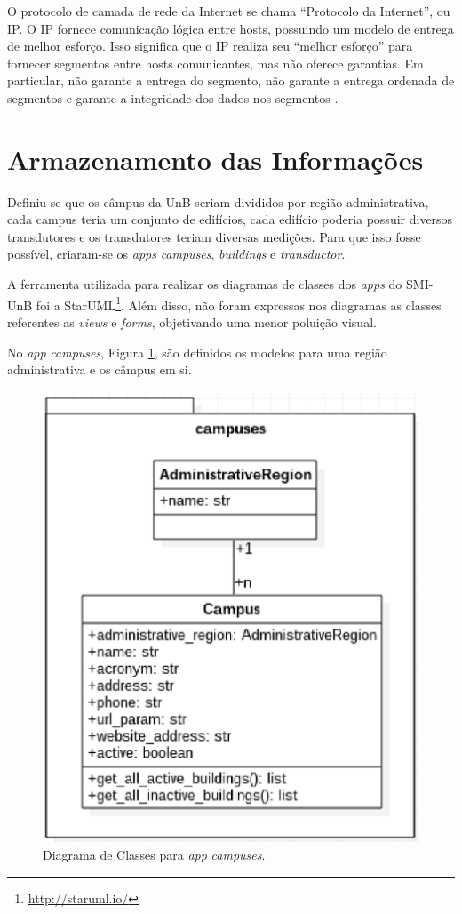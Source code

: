     O protocolo de camada de rede da Internet se chama ``Protocolo da Internet'', ou IP. O IP fornece comunicação lógica entre hosts, possuindo um modelo de entrega de melhor esforço. Isso significa que o IP realiza seu ``melhor esforço'' para fornecer segmentos entre hosts comunicantes, mas não oferece garantias. Em particular, não garante a entrega do segmento, não garante a entrega ordenada de segmentos e garante a integridade dos dados nos segmentos \cite{kurose_2002}.

\section{Armazenamento das Informações}
Definiu-se que os câmpus da UnB seriam divididos por região administrativa, cada campus teria um conjunto de edifícios, cada edifício poderia possuir diversos transdutores e os transdutores teriam diversas medições. Para que isso fosse possível, criaram-se os \textit{apps} \textit{campuses}, \textit{buildings} e \textit{transductor}.

A ferramenta utilizada para realizar os diagramas de classes dos \textit{apps} do SMI-UnB foi a StarUML\footnote{\url{http://staruml.io/}}. Além disso, não foram expressas nos diagramas as classes referentes as \textit{views} e \textit{forms}, objetivando uma menor poluição visual.

No \textit{app} \textit{campuses}, Figura \ref{campuses}, são definidos os modelos para uma região administrativa e os câmpus em si.

\begin{figure}[!h]
    \centering
    \includegraphics[keepaspectratio=true,scale=0.8]{figuras/campuses.eps}
    \caption{Diagrama de Classes para \textit{app} \textit{campuses}.}
    \label{campuses}
\end{figure}

